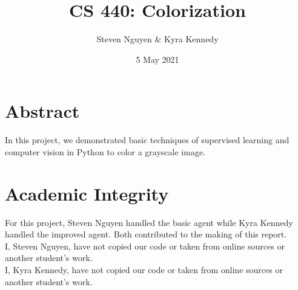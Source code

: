 \documentclass[12pt]{report}
\title{CS 440: Colorization}
\author{Steven Nguyen \& Kyra Kennedy}
\date{5 May 2021}
\begin{document}
\begin{titlepage}
\maketitle
\end{titlepage}

\section*{Abstract}
In this project, we demonstrated basic techniques of supervised learning and computer vision in Python to color a grayscale image.

\section*{Academic Integrity}
For this project, Steven Nguyen handled the basic agent while Kyra Kennedy handled the improved agent. Both contributed to the making of this report.\\
I, Steven Nguyen, have not copied our code or taken from online sources or another student's work.\\
I, Kyra Kennedy, have not copied our code or taken from online sources or another student's work.
\end{document}
